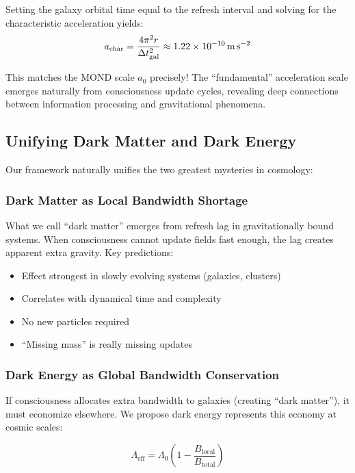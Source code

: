 \documentclass[10pt,a4paper]{article}
\newcommand{\azero}{a_0}
\begin{document}
Setting the galaxy orbital time equal to the refresh interval and solving for the characteristic acceleration yields:
\begin{equation}
a_{\text{char}} = \frac{4\pi^2 r}{\Delta t_{\text{gal}}^2} \approx 1.22 \times 10^{-10}\,\text{m\,s}^{-2}
\end{equation}

This matches the MOND scale $\azero$ precisely! The ``fundamental'' acceleration scale emerges naturally from consciousness update cycles, revealing deep connections between information processing and gravitational phenomena.

\subsection{Unifying Dark Matter and Dark Energy}

Our framework naturally unifies the two greatest mysteries in cosmology:

\subsubsection{Dark Matter as Local Bandwidth Shortage}

What we call ``dark matter'' emerges from refresh lag in gravitationally bound systems. When consciousness cannot update fields fast enough, the lag creates apparent extra gravity. Key predictions:
\begin{itemize}
\item Effect strongest in slowly evolving systems (galaxies, clusters)
\item Correlates with dynamical time and complexity
\item No new particles required
\item ``Missing mass'' is really missing updates
\end{itemize}

\subsubsection{Dark Energy as Global Bandwidth Conservation}

If consciousness allocates extra bandwidth to galaxies (creating ``dark matter''), it must economize elsewhere. We propose dark energy represents this economy at cosmic scales:

\begin{equation}
\Lambda_{\text{eff}} = \Lambda_0 \left(1 - \frac{B_{\text{local}}}{B_{\text{total}}}\right)
\end{equation}
\end{document}
